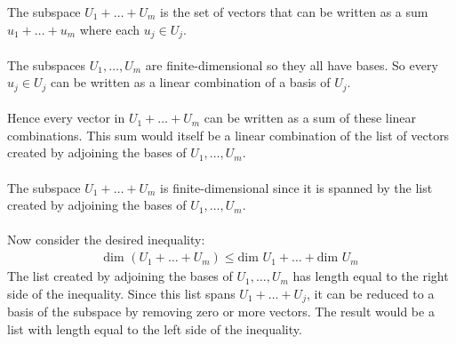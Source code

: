 \documentclass[a4paper]{article}
\begin{document}
\Large
The subspace $U_1 + \dots + U_m$ is the set of vectors that can be written as a sum $u_1 + \dots + u_m$ where each $u_j \in U_j$.
\\
\\
The subspaces $U_1, \dots, U_m$ are finite-dimensional so they all have bases.
So every $u_j \in U_j$ can be written as a linear combination of a basis of $U_j$.
\\
\\
Hence every vector in $U_1 + \dots + U_m$ can be written as a sum of these linear combinations.
This sum would itself be a linear combination of the list of vectors created by adjoining the bases of $U_1, \dots, U_m$.
\\
\\
The subspace $U_1 + \dots + U_m$ is finite-dimensional since it is spanned by the list created by adjoining the bases of $U_1, \dots, U_m$.
\\
\\
Now consider the desired inequality:
\begin{align*}
\text{dim }(U_1 + \dots + U_m) \le \text{dim }U_1 + \dots + \text{dim }U_m
\end{align*}
The list created by adjoining the bases of $U_1, \dots, U_m$ has length equal to the right side of the inequality.
Since this list spans $U_1 + \dots + U_j$, it can be reduced to a basis of the subspace by removing zero or more vectors.
The result would be a list with length equal to the left side of the inequality.
\end{document}

